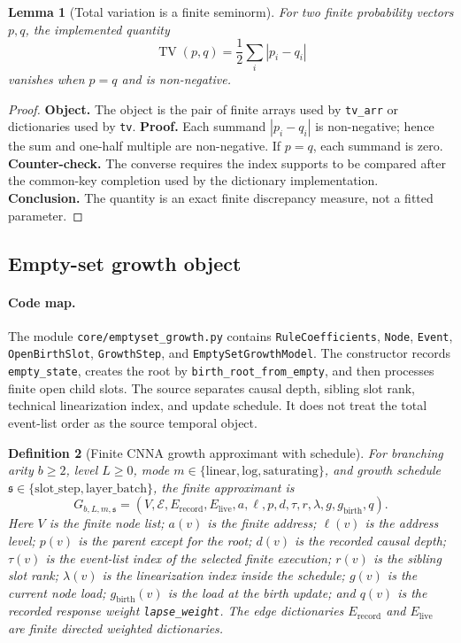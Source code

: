 \documentclass[11pt]{article}
\newtheorem{definition}{Definition}[section]
\newtheorem{lemma}[definition]{Lemma}
\theoremstyle{remark}
\newcommand{\code}[1]{\texttt{#1}}
\numberwithin{equation}{section}
\begin{document}
\begin{lemma}[Total variation is a finite seminorm]
For two finite probability vectors \(p,q\), the implemented quantity
\[
  \operatorname{TV}(p,q)=\frac12\sum_i |p_i-q_i|
\]
vanishes when \(p=q\) and is non-negative.
\end{lemma}
\begin{proof}
\textbf{Object.} The object is the pair of finite arrays used by \code{tv\_\allowbreak{}arr} or dictionaries used by \code{tv}. \textbf{Proof.} Each summand \(|p_i-q_i|\) is non-negative; hence the sum and one-half multiple are non-negative. If \(p=q\), each summand is zero. \textbf{Counter-check.} The converse requires the index supports to be compared after the common-key completion used by the dictionary implementation. \textbf{Conclusion.} The quantity is an exact finite discrepancy measure, not a fitted parameter.
\end{proof}



\subsection{Empty-set growth object}
\paragraph{Code map.} The module \code{core/emptyset\_\allowbreak{}growth.py} contains \code{RuleCoefficients}, \code{Node}, \code{Event}, \code{OpenBirthSlot}, \code{GrowthStep}, and \code{EmptySetGrowthModel}. The constructor records \code{empty\_\allowbreak{}state}, creates the root by \code{birth\_\allowbreak{}root\_\allowbreak{}from\_\allowbreak{}empty}, and then processes finite open child slots. The source separates causal depth, sibling slot rank, technical linearization index, and update schedule. It does not treat the total event-list order as the source temporal object.

\begin{definition}[Finite CNNA growth approximant with schedule]
For branching arity \(b\ge 2\), level \(L\ge 0\), mode \(m\in\{\mathrm{linear},\mathrm{log},\mathrm{saturating}\}\), and growth schedule \(\mathfrak{s}\in\{\mathrm{slot\_step},\mathrm{layer\_batch}\}\), the finite approximant is
\begin{equation}
  G_{b,L,m,\mathfrak{s}}=(V,\mathcal E,E_{\mathrm{record}},E_{\mathrm{live}},a,\ell,p,d,\tau,r,\lambda,g,g_{\mathrm{birth}},q).
  \label{eq:finite-growth-approximant}
\end{equation}
Here \(V\) is the finite node list; \(a(v)\) is the finite address; \(\ell(v)\) is the address level; \(p(v)\) is the parent except for the root; \(d(v)\) is the recorded causal depth; \(\tau(v)\) is the event-list index of the selected finite execution; \(r(v)\) is the sibling slot rank; \(\lambda(v)\) is the linearization index inside the schedule; \(g(v)\) is the current node load; \(g_{\mathrm{birth}}(v)\) is the load at the birth update; and \(q(v)\) is the recorded response weight \code{lapse\_\allowbreak{}weight}. The edge dictionaries \(E_{\mathrm{record}}\) and \(E_{\mathrm{live}}\) are finite directed weighted dictionaries.
\end{definition}
\end{document}

